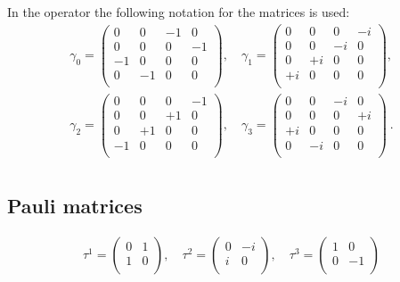 In the operator the following notation for
the matrices is used:
\[
\begin{split}
  \gamma_0 = \begin{pmatrix}
    0 & 0 & -1 & 0 \\
    0 & 0 & 0 & -1 \\
    -1 & 0 & 0 & 0 \\
    0 & -1 & 0 & 0 \\
  \end{pmatrix},\quad
  \gamma_1 = \begin{pmatrix}
    0 & 0 & 0 & -i \\
    0 & 0 & -i & 0 \\
    0 & +i & 0 & 0 \\
    +i & 0 & 0 & 0 \\    
  \end{pmatrix},\\
  \gamma_2 = \begin{pmatrix}
    0 & 0 & 0 & -1 \\
    0 & 0 & +1 & 0 \\
    0 & +1 & 0 & 0 \\
    -1 & 0 & 0 & 0 \\   
  \end{pmatrix},\quad
  \gamma_3 = \begin{pmatrix}
    0 & 0 & -i & 0 \\
    0 & 0 & 0 & +i \\
    +i & 0 & 0 & 0 \\
    0 & -i & 0 & 0 \\
  \end{pmatrix}\ .\\
\end{split}
\]

\subsection{Pauli matrices}
\[
\begin{split}
  \tau^1 =
  \begin{pmatrix}
    0 & 1 \\
    1 & 0 \\
  \end{pmatrix},\quad
  \tau^2 = 
  \begin{pmatrix}
    0 & -i \\
    i & 0 \\
  \end{pmatrix},\quad
  \tau^3 = 
  \begin{pmatrix}
    1 & 0 \\
    0 & -1 \\
  \end{pmatrix}
\end{split}
\]


